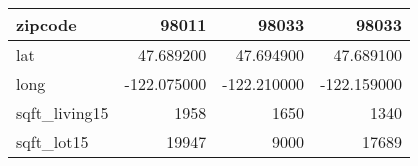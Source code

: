 \begin{table}[H]
\begin{tabular}{|l|r|r|r|}
\hline zipcode & \cellcolor[rgb]{0.9, 0.54, 0.52} 98011 & 98033 & 98033 \\
\hline lat & \cellcolor[rgb]{0.9, 0.54, 0.52} 47.689200 & 47.694900 & 47.689100 \\
\hline long & \cellcolor[rgb]{0.9, 0.54, 0.52} -122.075000 & \cellcolor[rgb]{0.9, 0.54, 0.52} -122.210000 & \cellcolor[rgb]{0.9, 0.54, 0.52} -122.159000 \\
\hline sqft\_living15 & \cellcolor[rgb]{0.9, 0.54, 0.52} 1958 & 1650 & 1340 \\
\hline sqft\_lot15 & \cellcolor[rgb]{0.9, 0.54, 0.52} 19947 & 9000 & 17689 \\
\hline
\end{tabular}
\end{table}

